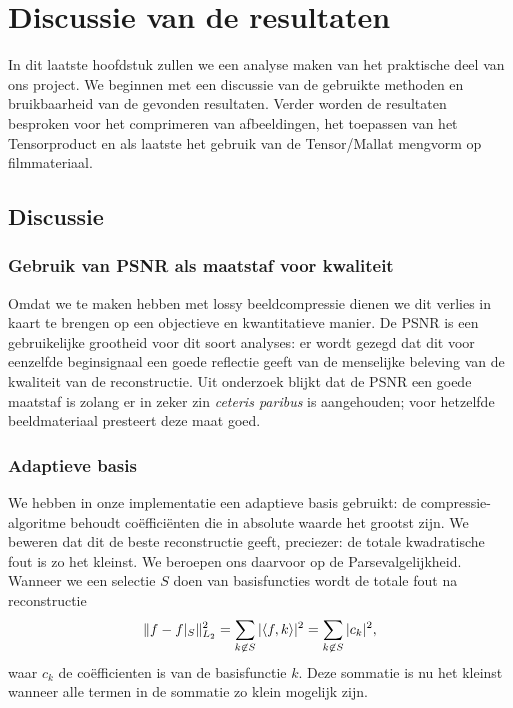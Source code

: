 \chapter{Discussie van de resultaten}
\label{discH}
In dit laatste hoofdstuk zullen we een analyse maken van het praktische deel van ons project.
We beginnen met een discussie van de gebruikte methoden en bruikbaarheid van de gevonden resultaten.
Verder worden de resultaten besproken voor het comprimeren van afbeeldingen, het toepassen van het 
Tensorproduct en als laatste het gebruik van de Tensor/Mallat mengvorm op filmmateriaal. 

\section{Discussie}
\subsection{Gebruik van PSNR als maatstaf voor kwaliteit}
Omdat we te maken hebben met lossy beeldcompressie dienen we dit verlies in kaart te brengen op een 
objectieve en kwantitatieve manier. 
De PSNR is een gebruikelijke grootheid voor dit soort analyses: er wordt gezegd dat dit voor eenzelfde 
beginsignaal een goede reflectie geeft van de menselijke beleving van de kwaliteit van de reconstructie.
Uit onderzoek \cite{PSNR} blijkt dat de PSNR een goede maatstaf is zolang er in zeker zin \emph{ceteris paribus}
is aangehouden; voor hetzelfde beeldmateriaal presteert deze maat goed.

\subsection{Adaptieve basis}
\label{adaptief_parseval}
We hebben in onze implementatie een adaptieve basis gebruikt: de compressie-algoritme behoudt co\"effici\"enten
die in absolute waarde het grootst zijn. 
We beweren dat dit de beste reconstructie geeft, preciezer: de totale kwadratische fout is zo het kleinst.
We beroepen ons daarvoor op de Parsevalgelijkheid. Wanneer we een selectie $S$ doen van basisfuncties wordt de totale fout na reconstructie
\[
\|f-f|_{S}\|^2_{L_2} = \sum_{k\not\in S} |\langle f , k \rangle|^2 = \sum_{k\not\in S} |c_k|^2,
\]
waar $c_k$ de co\"efficienten is van de basisfunctie $k$. 
Deze sommatie is nu het kleinst wanneer alle termen in de sommatie zo klein mogelijk zijn. 

